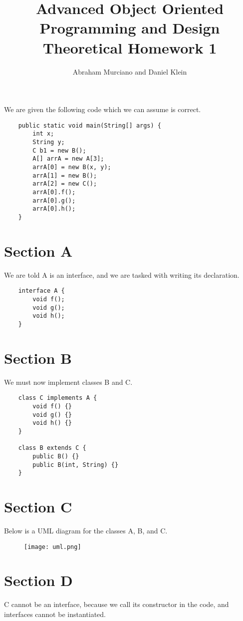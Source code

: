 \documentclass{article}
\title{Advanced Object Oriented Programming and Design\\
\medskip
\large Theoretical Homework 1}
\author{Abraham Murciano and Daniel Klein}
\begin{document}
\maketitle

We are given the following code which we can assume is correct.

\begin{verbatim}
	public static void main(String[] args) {
	    int x;
	    String y;
	    C b1 = new B();
	    A[] arrA = new A[3];
	    arrA[0] = new B(x, y);
	    arrA[1] = new B();
	    arrA[2] = new C();
	    arrA[0].f();
	    arrA[0].g();
	    arrA[0].h();
	}
\end{verbatim}

\section*{Section A}

We are told A is an interface, and we are tasked with writing its declaration.

\begin{verbatim}
	interface A {
	    void f();
	    void g();
	    void h();
	}
\end{verbatim}

\section*{Section B}

We must now implement classes B and C.

\begin{verbatim}
	class C implements A {
	    void f() {}
	    void g() {}
	    void h() {}
	}

	class B extends C {
	    public B() {}
	    public B(int, String) {}
	}
\end{verbatim}

\section{Section C}

Below is a UML diagram for the classes A, B, and C.

\begin{figure}[htbp]
	\centering
	\texttt{[image: uml.png]}
\end{figure}


\section{Section D}

C cannot be an interface, because we call its constructor in the code, and interfaces cannot be instantiated.
\end{document}

